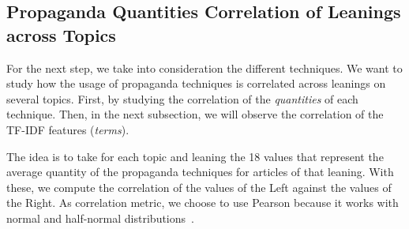 \subsection{\statusgreen Propaganda Quantities Correlation of Leanings across Topics}
\label{ssec:topic_propaganda_leaning_tech_quantities}




For the next step, we take into consideration the different techniques. We want to study how the usage of propaganda techniques is correlated across leanings on several topics.
%
First, by studying the correlation of the \emph{quantities} of each technique. Then, in the next subsection, we will observe the correlation of the TF-IDF features (\emph{terms}).

The idea is to take for each topic and leaning the 18 values that represent the average quantity of the propaganda techniques for articles of that leaning. With these, we compute the correlation of the values of the Left against the values of the Right.
%
As correlation metric, we choose to use Pearson because it works with normal and half-normal distributions~\citep{pearson1931analysis}.

